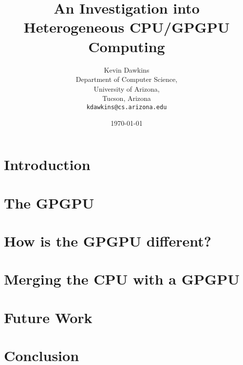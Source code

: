 \documentclass[12pt,notitlepage]{report}
\begin{document}
\setcounter{tocdepth}{4}

\title{An Investigation into Heterogeneous CPU/GPGPU Computing}
\author{Kevin Dawkins\\
  Department of Computer Science,\\
  University of Arizona,\\
  Tucson, Arizona\\
  \texttt{kdawkins@cs.arizona.edu}}
\date{\today}
\maketitle



\tableofcontents

\chapter*{Introduction}


\chapter*{The GPGPU}


\chapter*{How is the GPGPU different?}


\chapter*{Merging the CPU with a GPGPU}


\chapter*{Future Work}


\chapter*{Conclusion}


\nocite{nvidia, mapreduce, cpuassist}



\end{document}
